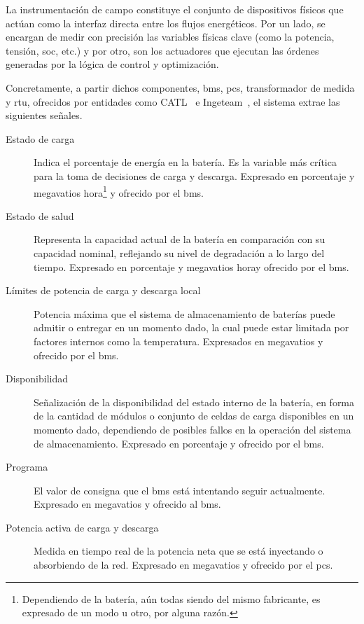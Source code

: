 La instrumentación de campo constituye el conjunto de dispositivos físicos que actúan como la interfaz directa entre los flujos energéticos. Por un lado, se encargan de medir con precisión las variables físicas clave (como la potencia, tensión, \gls{soc}, etc.) y por otro, son los actuadores que ejecutan las órdenes generadas por la lógica de control y optimización.

Concretamente, a partir dichos componentes, \gls{bms}, \gls{pcs}, transformador de medida y \gls{rtu}, ofrecidos por entidades como CATL~\cite{catl2023catl} e Ingeteam~\cite{ingeteam2025ingeteam}, el sistema extrae las siguientes señales.

\begin{description}

  \item[Estado de carga] Indica el porcentaje de energía en la batería. Es la variable más crítica para la toma de decisiones de carga y descarga. Expresado en porcentaje y megavatios hora\footnote{Dependiendo de la batería, aún todas siendo del mismo fabricante, es expresado de un modo u otro, por alguna razón.} y ofrecido por el \gls{bms}.

  \item[Estado de salud] Representa la capacidad actual de la batería en comparación con su capacidad nominal, reflejando su nivel de degradación a lo largo del tiempo. Expresado en porcentaje y megavatios hora\footnotemark[\value{footnote}] y ofrecido por el \gls{bms}.

  \item[Límites de potencia de carga y descarga local] Potencia máxima que el sistema de almacenamiento de baterías puede admitir o entregar en un momento dado, la cual puede estar limitada por factores internos como la temperatura. Expresados en megavatios y ofrecido por el \gls{bms}.

  \item[Disponibilidad] Señalización de la disponibilidad del estado interno de la batería, en forma de la cantidad de módulos o conjunto de celdas de carga disponibles en un momento dado, dependiendo de posibles fallos en la operación del sistema de almacenamiento. Expresado en porcentaje y ofrecido por el \gls{bms}.

  \item[Programa] El valor de consigna que el \gls{bms} está intentando seguir actualmente. Expresado en megavatios y ofrecido al \gls{bms}.

  \item[Potencia activa de carga y descarga] Medida en tiempo real de la potencia neta que se está inyectando o absorbiendo de la red. Expresado en megavatios y ofrecido por el \gls{pcs}.


\end{description}

